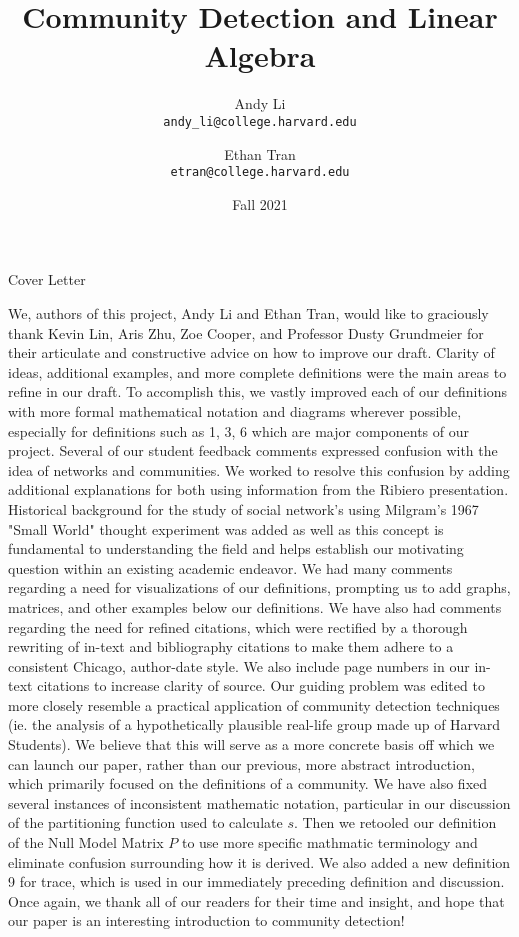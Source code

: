 \documentclass{article}
\title{Community Detection and Linear Algebra}
\date{Fall 2021}
\author{Andy Li\\ \texttt{andy\_li@college.harvard.edu} \and Ethan Tran\\ \texttt{etran@college.harvard.edu}}
\begin{document}
\maketitle

\pagebreak

\begin{center}
 {\huge Cover Letter}
\end{center}
 
 \bigskip 
 
We, authors of this project, Andy Li and Ethan Tran, would like to graciously thank Kevin Lin, Aris Zhu, Zoe Cooper, and Professor Dusty Grundmeier for their articulate and constructive advice on how to improve our draft. 
Clarity of ideas, additional examples, and more complete definitions were the main areas to refine in our draft. 
To accomplish this, we vastly improved each of our definitions with more formal mathematical notation and diagrams wherever possible, especially for definitions such as 1, 3, 6 which are major components of our project. 
Several of our student feedback comments expressed confusion with the idea of networks and communities. 
We worked to resolve this confusion by adding additional explanations for both using information from the Ribiero presentation. 
Historical background for the study of social network's using Milgram's 1967 "Small World" thought experiment was added as well as this concept is fundamental to understanding the field and helps establish our motivating question within an existing academic endeavor. 
We had many comments regarding a need for visualizations of our definitions, prompting us to add graphs, matrices, and other examples below our definitions. 
We have also had comments regarding the need for refined citations, which were rectified by a thorough rewriting of in-text and bibliography citations to make them adhere to a consistent Chicago, author-date style. We also include page numbers in our in-text citations to increase clarity of source. 
Our guiding problem was edited to more closely resemble a practical application of community detection techniques (ie. the analysis of a hypothetically plausible real-life group made up of Harvard Students). 
We believe that this will serve as a more concrete basis off which we can launch our paper, rather than our previous, more abstract introduction, which primarily focused on the definitions of a community. 
We have also fixed several instances of inconsistent mathematic notation, particular in our discussion of the partitioning function used to calculate $s$. 
Then we retooled our definition of the Null Model Matrix $P$ to use more specific mathmatic terminology and eliminate confusion surrounding how it is derived. 
We also added a new definition 9 for trace, which is used in our immediately preceding definition and discussion.
Once again, we thank all of our readers for their time and insight, and hope that our paper is an interesting introduction to community detection! 
\end{document}
